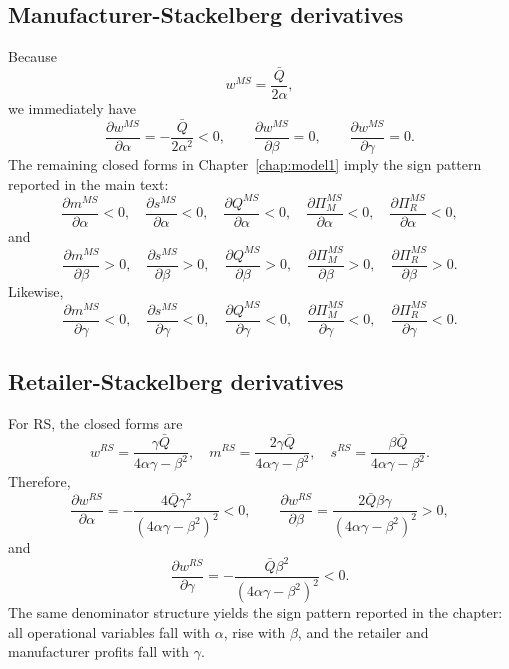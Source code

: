\subsection{Manufacturer-Stackelberg derivatives}

Because
\begin{equation}
 w^{MS}=\frac{\bar Q}{2\alpha},
\end{equation}
we immediately have
\begin{equation}
 \frac{\partial w^{MS}}{\partial \alpha}=-\frac{\bar Q}{2\alpha^2}<0,
 \qquad
 \frac{\partial w^{MS}}{\partial \beta}=0,
 \qquad
 \frac{\partial w^{MS}}{\partial \gamma}=0.
\end{equation}
The remaining closed forms in Chapter~\ref{chap:model1} imply the sign pattern
reported in the main text:
\begin{equation}
 \frac{\partial m^{MS}}{\partial \alpha}<0,
 \quad
 \frac{\partial s^{MS}}{\partial \alpha}<0,
 \quad
 \frac{\partial Q^{MS}}{\partial \alpha}<0,
 \quad
 \frac{\partial \Pi_M^{MS}}{\partial \alpha}<0,
 \quad
 \frac{\partial \Pi_R^{MS}}{\partial \alpha}<0,
\end{equation}
and
\begin{equation}
 \frac{\partial m^{MS}}{\partial \beta}>0,
 \quad
 \frac{\partial s^{MS}}{\partial \beta}>0,
 \quad
 \frac{\partial Q^{MS}}{\partial \beta}>0,
 \quad
 \frac{\partial \Pi_M^{MS}}{\partial \beta}>0,
 \quad
 \frac{\partial \Pi_R^{MS}}{\partial \beta}>0.
\end{equation}
Likewise,
\begin{equation}
 \frac{\partial m^{MS}}{\partial \gamma}<0,
 \quad
 \frac{\partial s^{MS}}{\partial \gamma}<0,
 \quad
 \frac{\partial Q^{MS}}{\partial \gamma}<0,
 \quad
 \frac{\partial \Pi_M^{MS}}{\partial \gamma}<0,
 \quad
 \frac{\partial \Pi_R^{MS}}{\partial \gamma}<0.
\end{equation}

\subsection{Retailer-Stackelberg derivatives}

For RS, the closed forms are
\begin{equation}
 w^{RS}=\frac{\gamma\bar Q}{4\alpha\gamma-\beta^2},
 \quad
 m^{RS}=\frac{2\gamma\bar Q}{4\alpha\gamma-\beta^2},
 \quad
 s^{RS}=\frac{\beta\bar Q}{4\alpha\gamma-\beta^2}.
\end{equation}
Therefore,
\begin{equation}
 \frac{\partial w^{RS}}{\partial \alpha}
 =-\frac{4\bar Q\gamma^2}{(4\alpha\gamma-\beta^2)^2}<0,
 \qquad
 \frac{\partial w^{RS}}{\partial \beta}
 =\frac{2\bar Q\beta\gamma}{(4\alpha\gamma-\beta^2)^2}>0,
\end{equation}
and
\begin{equation}
 \frac{\partial w^{RS}}{\partial \gamma}
 =-\frac{\bar Q\beta^2}{(4\alpha\gamma-\beta^2)^2}<0.
\end{equation}
The same denominator structure yields the sign pattern reported in the chapter:
all operational variables fall with $\alpha$, rise with $\beta$, and the
retailer and manufacturer profits fall with $\gamma$.

